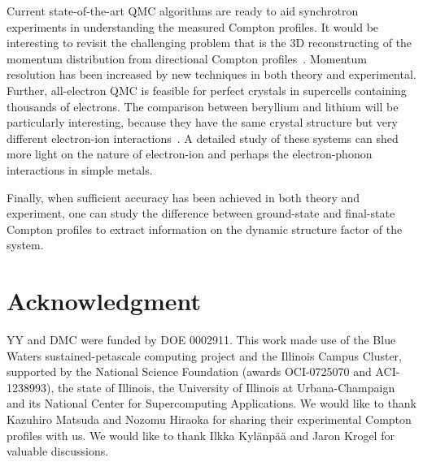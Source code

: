 \documentclass[aps,prb,showpacs,preprintnumbers,amsmath,amssymb,superscriptaddress,twocolumn]{revtex4}
\begin{document}
Current state-of-the-art QMC algorithms are ready to aid synchrotron experiments in understanding the measured Compton profiles. It would be interesting to revisit the challenging problem that is the 3D reconstructing of the momentum distribution from directional Compton profiles~\cite{Schulke1996,Tanaka2001}. Momentum resolution has been increased by new techniques in both theory and experimental. Further, all-electron QMC is feasible for perfect crystals in supercells containing thousands of electrons. The comparison between beryllium and lithium will be particularly interesting, because they have the same crystal structure but very different electron-ion interactions~\cite{P.EisenbergerL.LamP.M.Platzman1972}. A detailed study of these systems can shed more light on the nature of electron-ion and perhaps the electron-phonon interactions in simple metals.

Finally, when sufficient accuracy has been achieved in both theory and experiment, one can study the difference between ground-state and final-state Compton profiles to extract information on the dynamic structure factor of the system.

\section{Acknowledgment}

YY and DMC were funded by DOE 0002911. This work made use of the Blue Waters sustained-petascale computing project and the Illinois Campus Cluster, supported by the National Science Foundation (awards OCI-0725070 and ACI-1238993), the state of Illinois, the University of Illinois at Urbana-Champaign and its National Center for Supercomputing Applications. We would like to thank Kazuhiro Matsuda and Nozomu Hiraoka for sharing their experimental Compton profiles with us. We would like to thank Ilkka Kyl\"anp\"a\"a and Jaron Krogel for valuable discussions.

\end{document}
